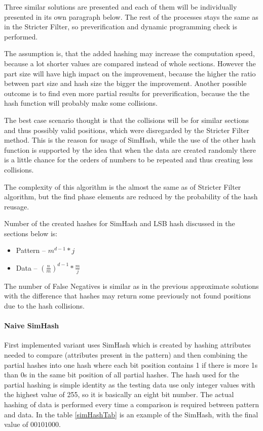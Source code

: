 Three similar solutions are presented and each of them will be individually presented in its own paragraph below. The rest of the processes stays the same as in the Stricter Filter, so preverification and dynamic programming check is performed.

The assumption is, that the added hashing may increase the computation speed, because a lot shorter values are compared instead of whole sections. However the part size will have high impact on the improvement, because the higher the ratio between part size and hash size the bigger the improvement. Another possible outcome is to find even more partial results for preverification, because the the hash function will probably make some collisions.

The best case scenario thought is that the collisions will be for similar sections and thus possibly valid positions, which were disregarded by the Stricter Filter method. This is the reason for usage of SimHash, while the use of the other hash function is supported by the idea that when the data are created randomly there is a little chance for the orders of numbers to be repeated and thus creating less collisions.

The complexity of this algorithm is the almost the same as of Stricter Filter algorithm, but the find phase elements are reduced by the probability of the hash reusage.

Number of the created hashes for SimHash and LSB hash discussed in the sections below is:
\begin{itemize}
\item Pattern -- $m^{d-1} * j$
\item Data -- $(\frac{n}{m})^{d-1} * \frac{m}{j}$
\end{itemize}

The number of False Negatives is similar as in the previous approximate solutions with the difference that hashes may return some previously not found positions due to the hash collisions.

\paragraph{Naive SimHash} First implemented variant uses SimHash which is created by hashing attributes needed to compare (attributes present in the pattern) and then combining the partial hashes into one hash where each bit position contains 1 if there is more 1s than 0s in the same bit position of all partial hashes. The hash used for the partial hashing is simple identity as the testing data use only integer values with the highest value of 255, so it is  basically an eight bit number. The actual hashing of data is performed every time a comparison is required between pattern and data. In the table \ref{simHashTab} is an example of the SimHash, with the final value of $00101000$.

